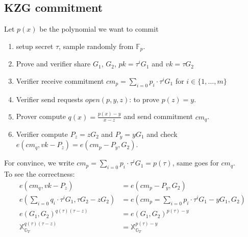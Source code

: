 \documentclass[10pt]{article}
\newcommand{\FField}{\mathbb{F}_p}
\begin{document}
\subsection{KZG commitment}
Let $p(x)$ be the polynomial we want to commit
\begin{enumerate}
    \item setup secret $\tau$, sample randomly from $\FField$.
    \item Prove and verifier share $G_1$, $G_2$, $pk = \tau^iG_1$ and $vk = \tau G_2$
    \item Verifier receive commitment ${cm}_p = \sum_{i=0}p_i \cdot \tau^iG_1$ for
        $i \in \{1, \ldots, m\}$
    \item Verifier send requests $open(p, y, z)$: to prove $p(z) = y$.
    \item Prover compute $q(x) = \frac{p(x) - y}{x-z}$ and send commitment
        ${cm}_q$.
    \item Verifier compute $P_z = zG_2$ and $P_y = yG_1$ and check 
        $e({cm}_q, vk-P_z) = e({cm}_p-P_y, G_2)$.
\end{enumerate}
For convince, we write $cm_{p} = \sum_{i=0}p_i \cdot \tau^iG_1 = p(\tau)$, same
goes for ${cm}_q$.\\
To see the correctness:
\[
\begin{aligned}
    e({cm}_q, vk-P_z) &= e({cm}_p-P_y, G_2)\\
    e(\sum_{i=0}q_i \cdot \tau^iG_1, \tau G_2-z G_2) &= e({cm}_p =
    \sum_{i=0}p_i \cdot \tau^iG_1-yG_1, G_2)\\
    e(G_1, G_2)^{q(\tau)(\tau - z)} &= e(G_1,G_2)^{p(\tau)-y}\\
    \mathbb{X}^{q(\tau)(\tau - z)}_{\mathbb{G}_T} &= \mathbb{X}^{p(\tau) - y}_{\mathbb{G}_T}
\end{aligned}
\]
\end{document}
